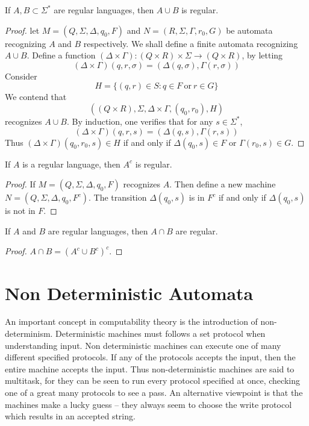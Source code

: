 \begin{theorem}
    If $A, B \subset \Sigma^*$ are regular languages, then $A \cup B$ is regular.
\end{theorem}
\begin{proof}
    let $M = (Q, \Sigma, \Delta, q_0, F)$ and $N = (R, \Sigma, \Gamma, r_0, G)$ be automata recognizing $A$ and $B$ respectively. We shall define a finite automata recognizing $A \cup B$. Define a function $(\Delta \times \Gamma) : (Q \times R) \times \Sigma \to (Q \times R)$, by letting
    \[ (\Delta \times \Gamma)(q,r,\sigma) = (\Delta(q,\sigma), \Gamma(r,\sigma)) \]
    Consider
    \[ H = \{ (q,r) \in S : q \in F\ \text{or}\ r \in G \} \]
    We contend that
    \[ ((Q \times R), \Sigma, \Delta \times \Gamma, (q_0, r_0), H) \]
    recognizes $A \cup B$. By induction, one verifies that for any $s \in \Sigma^*$,
    \[ (\Delta \times \Gamma)(q,r,s) = (\Delta(q,s), \Gamma(r,s)) \]
    Thus $(\Delta \times \Gamma)(q_0, r_0, s) \in H$ if and only if $\Delta(q_0, s) \in F$ or $\Gamma(r_0, s) \in G$.
\end{proof}

\begin{theorem}
    If $A$ is a regular language, then $A^c$ is regular.
\end{theorem}
\begin{proof}
    If $M = (Q,\Sigma,\Delta,q_0,F)$ recognizes $A$. Then define a new machine $N = (Q,\Sigma,\Delta,q_0,F^c)$. The transition $\Delta(q_0, s)$ is in $F^c$ if and only if $\Delta(q_0, s)$ is not in $F$.
\end{proof}

\begin{corollary}
    If $A$ and $B$ are regular languages, then $A \cap B$ are regular.
\end{corollary}
\begin{proof} $A \cap B = (A^c \cup B^c)^c$. \end{proof}

\section{Non Deterministic Automata}

An important concept in computability theory is the introduction of non-determinism. Deterministic machines must follows a set protocol when understanding input. Non deterministic machines can execute one of many different specified protocols. If any of the protocols accepts the input, then the entire machine accepts the input. Thus non-deterministic machines are said to multitask, for they can be seen to run every protocol specified at once, checking one of a great many protocols to see a pass. An alternative viewpoint is that the machines make a lucky guess -- they always seem to choose the write protocol which results in an accepted string.

